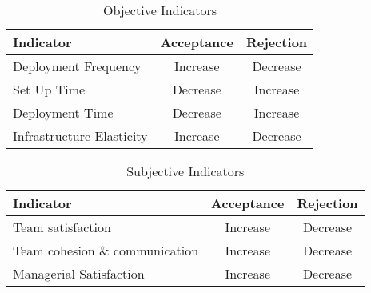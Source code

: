 		\begin{table}[h!]
			\centering
            \caption{Objective Indicators}
			\label{tab1}
			\begin{tabular}{|l|c|c|}
               	\hline
 				Indicator & Acceptance & Rejection  \\ \hline
 				Deployment Frequency & Increase  & Decrease   \\ \hline
 				Set Up Time & Decrease &  Increase  \\ \hline
 				Deployment Time & Decrease &  Increase  \\ \hline
 				Infrastructure Elasticity & Increase & Decrease \\ \hline 
			\end{tabular}
		\end{table}



		\begin{table}[h!]
			\centering
            \caption{Subjective Indicators}
			\label{tab2}
				\begin{tabular}{|l|c|c|}
                	\hline
 					Indicator & Acceptance & Rejection  \\ \hline
 					Team satisfaction & Increase  & Decrease   \\ \hline
 					Team cohesion \& communication & Increase  & Decrease   \\ \hline
 					Managerial Satisfaction & Increase &  Decrease  \\ \hline
				\end{tabular}
			\end{table}

		